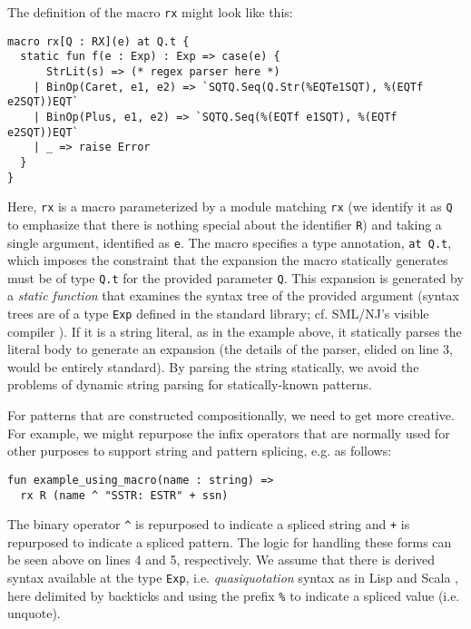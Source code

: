 The definition of the macro \lstinline{rx} might look like this:
\begin{lstlisting}
macro rx[Q : RX](e) at Q.t {
  static fun f(e : Exp) : Exp => case(e) {
      StrLit(s) => (* regex parser here *)
    | BinOp(Caret, e1, e2) => `SQTQ.Seq(Q.Str(%EQTe1SQT), %(EQTf e2SQT))EQT`
    | BinOp(Plus, e1, e2) => `SQTQ.Seq(%(EQTf e1SQT), %(EQTf e2SQT))EQT`
    | _ => raise Error
  }
}
\end{lstlisting}

Here, \lstinline{rx} is a macro parameterized by a module matching \lstinline{rx} (we identify it as \lstinline{Q} to emphasize that there is nothing special about the identifier \lstinline{R}) and taking a single argument, identified as \lstinline{e}. The macro specifies a type annotation, \lstinline{at Q.t}, which imposes the constraint that the expansion the macro statically generates must be of type \lstinline{Q.t} for the provided parameter \lstinline{Q}. This expansion is generated by a \emph{static function} that examines the syntax tree of the provided argument (syntax trees are of a type \lstinline{Exp} defined in the standard library; cf. SML/NJ's visible compiler \cite{SML/VisibleCompiler}). If it is a string literal, as in the example above, it statically parses the literal body to generate an expansion (the details of the parser, elided on line 3, would be entirely standard). 
By parsing the string statically, we avoid the problems of dynamic string parsing for statically-known patterns. 

For patterns that are constructed compositionally, we need to get more creative. For example, we might repurpose the infix operators that are normally used for other purposes to support string and pattern splicing, e.g. as follows:

\begin{lstlisting}[numbers=none,escapechar=|]
fun example_using_macro(name : string) => 
  rx R (name ^ "SSTR: ESTR" + ssn)
\end{lstlisting}

The binary operator \lstinline{^} is repurposed to indicate a spliced string and \lstinline{+} is repurposed to indicate a spliced pattern. The logic for handling these forms can be seen above on lines 4 and 5, respectively. We assume that there is derived syntax available at the type \lstinline{Exp}, i.e. \emph{quasiquotation} syntax as in Lisp \cite{Bawd99a} and Scala \cite{shabalin2013quasiquotes}, here delimited by backticks and using the prefix \lstinline{%} to indicate a spliced value (i.e. unquote). 

